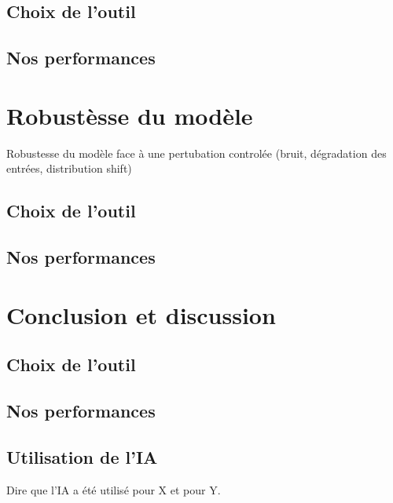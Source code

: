 \documentclass[10pt,a4paper,twocolumn]{article}
\begin{document}
\subsection{Choix de l'outil}

\subsection{Nos performances}

\section{Robustèsse du modèle}
Robustesse du modèle face à une pertubation controlée (bruit, dégradation des entrées, distribution shift)
\subsection{Choix de l'outil}

\subsection{Nos performances}

\section{Conclusion et discussion}
\subsection{Choix de l'outil}

\subsection{Nos performances}

\subsection{Utilisation de l'IA}
Dire que l'IA a été utilisé pour X et pour Y.
\end{document}
